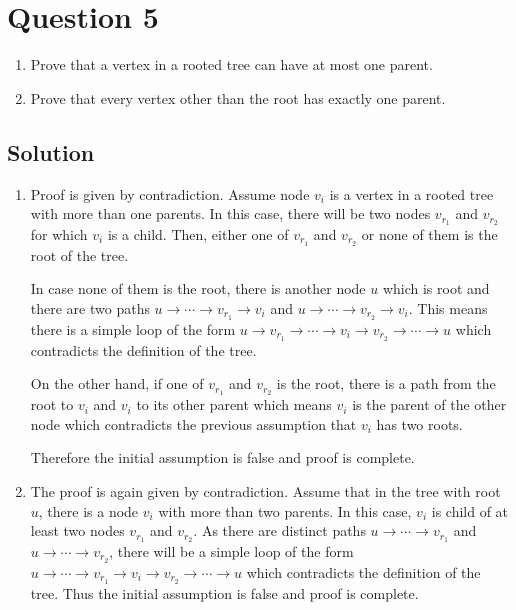 
\section*{Question 5}

\begin{enumerate}
\item Prove that a vertex in a rooted tree can have at most one parent.
\item Prove that every vertex other than the root has exactly one parent.
\end{enumerate}

\subsection*{Solution}

\begin{enumerate}
\item Proof is given by contradiction.
Assume node $v_i$ is a vertex in a rooted tree with more than one parents.
In this case, there will be two nodes $v_{r_1}$ and $v_{r_2}$ for which $v_i$ is a child.
Then, either one of $v_{r_1}$ and $v_{r_2}$ or none of them is the root of the tree.

In case none of them is the root, there is another node $u$ which is root and there are two paths $u \rightarrow \cdots \rightarrow v_{r_1} \rightarrow v_i$ and $u \rightarrow \cdots \rightarrow v_{r_2} \rightarrow v_i$.
This means there is a simple loop of the form $u \rightarrow v_{r_1} \rightarrow \cdots \rightarrow v_i \rightarrow v_{r_2} \rightarrow \cdots \rightarrow u$ which contradicts the definition of the tree.

On the other hand, if one of $v_{r_1}$ and $v_{r_2}$ is the root, there is a path from the root to $v_i$ and $v_i$ to its other parent which means $v_i$ is the parent of the other node which contradicts the previous assumption that $v_i$ has two roots.

Therefore the initial assumption is false and proof is complete.

\item The proof is again given by contradiction.
Assume that in the tree with root $u$, there is a node $v_i$ with more than two parents.
In this case, $v_i$ is child of at least two nodes $v_{r_1}$ and $v_{r_2}$.
As there are distinct paths $u \rightarrow \cdots \rightarrow v_{r_1}$ and $u \rightarrow \cdots \rightarrow v_{r_2}$, there will be a simple loop of the form $u \rightarrow \cdots \rightarrow v_{r_1} \rightarrow v_i \rightarrow v_{r_2} \rightarrow \cdots \rightarrow u$ which contradicts the definition of the tree.
Thus the initial assumption is false and proof is complete.
\end{enumerate}
